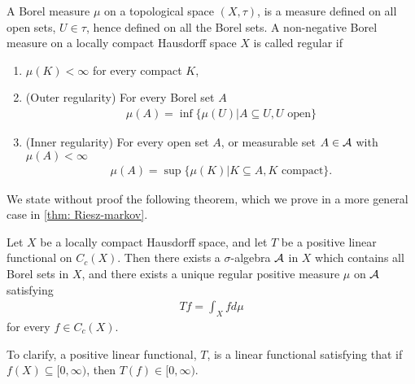 \documentclass[../../main.tex]{subfiles}
\begin{document}
\begin{definition}\label{def: regular}
A Borel measure $\mu$ on a topological space $(X, \tau)$, is a measure defined on all open sets, $U\in \tau$, hence defined on all the Borel sets. A non-negative Borel measure on a locally compact Hausdorff space $X$ is called regular if
\begin{enumerate}
\item $\mu(K)<\infty$ for every compact $K$,
\item (Outer regularity) For every Borel set $A$
\begin{align*}
	\mu(A)=\inf\{ \mu(U) | A\subseteq U, U \text{ open} \}
\end{align*}
\item (Inner regularity) For every open set $A$, or measurable set $A\in \mathcal{A}$ with $\mu(A)<\infty$
\begin{align*}
	\mu(A)=\sup\{ \mu(K) | K\subseteq A, K \text{ compact} \}.
\end{align*}
\end{enumerate}
\end{definition}

We state without proof the following theorem, which we prove in a more general case in \cref{thm: Riesz-markov}.

\begin{theorem}\label{thm: Riesz-Markov-Kakutani representation theorem}
Let $X$ be a locally compact Hausdorff space, and let $T$ be a positive linear functional on $C_{c}(X)$. Then there exists a $\sigma$-algebra $\mathcal{A}$ in $X$ which contains all Borel sets in $X$, and there exists a unique regular positive measure $\mu$ on $\mathcal{A}$ satisfying
\begin{align*}
	Tf=\int_{X}fd\mu
\end{align*}
for every $f\in C_{c}(X)$.
\end{theorem}

To clarify, a positive linear functional, $T$, is a linear functional satisfying that if $f(X)\subseteq [0,\infty)$, then $T(f)\in [0,\infty)$.
\end{document}
